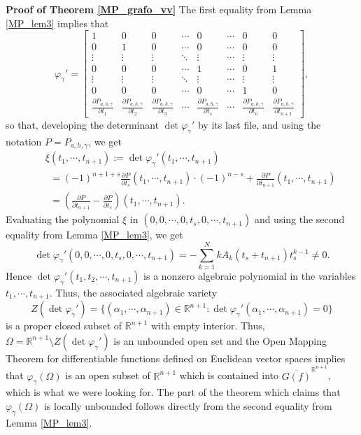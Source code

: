 \documentclass[10pt,a4paper]{amsart}
\theoremstyle{definition}
\begin{document}
\noindent \textbf{Proof of Theorem \ref{MP_grafo_vv} } The first equality from Lemma \ref{MP_lem3} implies that 
\begin{equation}\label{MP_det}
\varphi_{\gamma}'=\left [
\begin{array}{cccccccc}
1 & 0 & 0 & \cdots & 0 &\cdots & 0 & 0 \\
0 & 1 & 0 & \cdots & 0& \cdots & 0 &  0 \\
\vdots & \vdots & \vdots & \ddots & \vdots &\cdots & \vdots & \vdots \\
0 & 0 & 0 & \cdots & 1 & \cdots & 0 &  1\\
\vdots & \vdots & \vdots & \ddots & \vdots &\cdots & \vdots & \vdots \\
0 & 0 & 0 & \cdots & 0 &\cdots & 1 &  0\\
\frac{\partial P_{a,h,\gamma}}{\partial t_1} & \frac{\partial P_{a,h,\gamma}}{\partial t_2}  & \frac{\partial P_{a,h,\gamma}}{\partial t_3}  & \cdots & \frac{\partial P_{a,h,\gamma}}{\partial t_s} & \cdots & \frac{\partial P_{a,h,\gamma}}{\partial t_n}  &  \frac{\partial P_{a,h,\gamma}}{\partial t_{n+1}} 
\end{array} \right],
\end{equation}
so that, developing the determinant $\det\varphi_{\gamma}'$  by its last file, and using the notation $P=P_{a,h,\gamma}$, we get  
\begin{eqnarray*}
&\ & \xi(t_1,\cdots,t_{n+1}) := \det\varphi_{\gamma}' (t_1,\cdots,t_{n+1})\\
&\ & \ \ =  (-1)^{n+1+s}\frac{\partial P}{\partial t_{s}}(t_1,\cdots,t_{n+1})\cdot (-1)^{n-s}+\frac{\partial P}{\partial t_{n+1}}(t_1,\cdots,t_{n+1})\\
 &\ & \ \   = (\frac{\partial P}{\partial t_{n+1}} - \frac{\partial P}{\partial t_{s}})(t_1,\cdots,t_{n+1}) .
\end{eqnarray*}
Evaluating the polynomial  $\xi$ in $(0,0,\cdots,0,t_s,0,\cdots,t_{n+1})$ and using the second equality from Lemma \ref{MP_lem3}, we get
\[
\det\varphi_{\gamma}'(0,0,\cdots,0,t_s,0,\cdots,t_{n+1})= -\sum_{k=1}^NkA_k(t_s+t_{n+1})t_s^{k-1}\neq 0.
\]
Hence $\det\varphi_{\gamma}'(t_1,t_2,\cdots,t_{n+1})$ is a nonzero algebraic polynomial in the variables $t_1,\cdots,t_{n+1}$. Thus, the associated algebraic variety 
\[
Z(\det\varphi_{\gamma}')=\{(\alpha_1,\cdots,\alpha_{n+1})\in\mathbb{R}^{n+1}: \det\varphi_{\gamma}'(\alpha_1,\cdots,\alpha_{n+1})=0\}
\]
is a proper closed subset of $\mathbb{R}^{n+1}$ with empty interior. Thus,   
$\Omega=\mathbb{R}^{n+1}\setminus Z(\det\varphi_{\gamma}')$ is an unbounded open set and  the Open Mapping Theorem for differentiable functions defined on Euclidean vector spaces implies that 
$\varphi_{\gamma}(\Omega)$ is an open subset of $\mathbb{R}^{n+1}$ which is contained into $\overline{G(f)}^{\mathbb{R}^{n+1}}$, which is what we were looking for.  The part of the theorem which claims that $\varphi_{\gamma}(\Omega)$  is locally unbounded follows directly from the second equality from Lemma \ref{MP_lem3}. 
\end{document}
